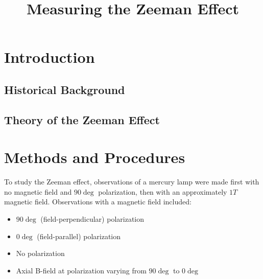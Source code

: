 \documentclass[twocolumn]{article}
\title{Measuring the Zeeman Effect}
\author{}
\begin{document}
\maketitle

\begin{abstract}
	
\end{abstract}

\section{Introduction} \label{sec:Intro}
	\subsection{Historical Background}

	\subsection{Theory of the Zeeman Effect} \label{sec:Theory}
		
\section{Methods and Procedures}
	To study the Zeeman effect, observations of a mercury lamp were made first with no magnetic field and $90\deg$ polarization, then with an approximately $1T$ magnetic field.
	Observations with a magnetic field included:
	\begin{itemize}
		\item $90\deg$ (field-perpendicular) polarization
		\item $0\deg$ (field-parallel) polarization 
		\item No polarization
		\item Axial B-field at polarization varying from $90\deg$ to $0\deg$
	\end{itemize}
	
\end{document}
